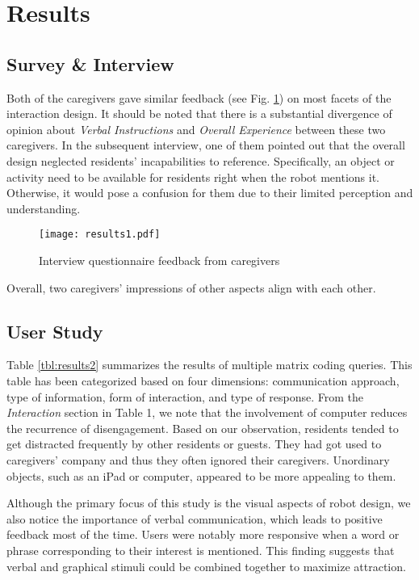 \documentclass[letterpaper, 10 pt, conference]{ieeeconf}  %
\begin{document}
\section{Results}


\subsection{Survey \& Interview}

Both of the caregivers gave similar feedback (see Fig. \ref{fig:results1}) on most facets of the interaction design. It should be noted that there is a substantial divergence of opinion about \textit{Verbal Instructions} and \textit{Overall Experience} between these two caregivers. In the subsequent interview, one of them pointed out that the overall design neglected residents' incapabilities to reference. Specifically, an object or activity need to be available for residents right when the robot mentions it. Otherwise, it would pose a confusion for them due to their limited perception and understanding.


\begin{figure}[hbt]
\centering
\texttt{[image: results1.pdf]}
\caption{Interview questionnaire feedback from caregivers}
\label{fig:results1}
\end{figure}

Overall, two caregivers' impressions of other aspects align with each other.

\subsection{User Study}

Table \ref{tbl:results2} summarizes the results of multiple matrix coding queries. This table has been categorized based on four dimensions: communication approach, type of information, form of interaction, and type of response. From the \textit{Interaction} section in Table 1, we note that the involvement of computer reduces the recurrence of disengagement. Based on our observation, residents tended to get distracted frequently by other residents or guests. They had got used to caregivers' company and thus they often ignored their caregivers. Unordinary objects, such as an iPad or computer, appeared to be more appealing to them.

Although the primary focus of this study is the visual aspects of robot design, we also notice the importance of verbal communication, which leads to positive feedback most of the time. Users were notably more responsive when a word or phrase corresponding to their interest is mentioned. This finding suggests that verbal and graphical stimuli could be combined together to maximize attraction. 
\end{document}
